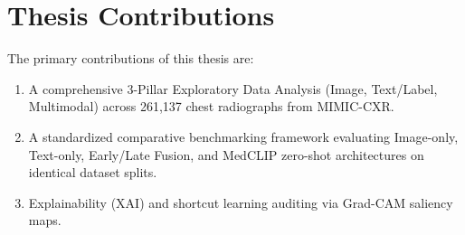 \section{Thesis Contributions}
The primary contributions of this thesis are:
\begin{enumerate}
    \item A comprehensive 3-Pillar Exploratory Data Analysis (Image, Text/Label, Multimodal) across 261,137 chest radiographs from MIMIC-CXR.
    \item A standardized comparative benchmarking framework evaluating Image-only, Text-only, Early/Late Fusion, and MedCLIP zero-shot architectures on identical dataset splits.
    \item Explainability (XAI) and shortcut learning auditing via Grad-CAM saliency maps.
\end{enumerate}
